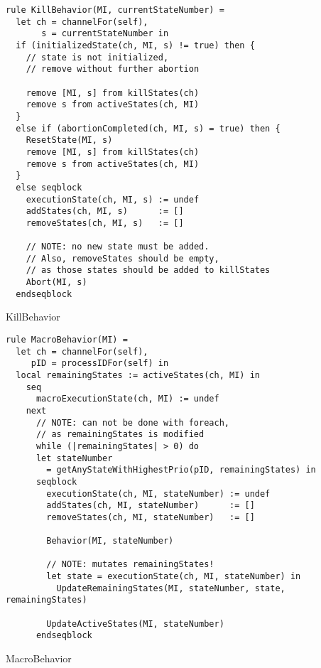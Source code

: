 \begin{listing}[H]
\begin{verbatim}
rule KillBehavior(MI, currentStateNumber) =
  let ch = channelFor(self),
       s = currentStateNumber in
  if (initializedState(ch, MI, s) != true) then {
    // state is not initialized,
    // remove without further abortion

    remove [MI, s] from killStates(ch)
    remove s from activeStates(ch, MI)
  }
  else if (abortionCompleted(ch, MI, s) = true) then {
    ResetState(MI, s)
    remove [MI, s] from killStates(ch)
    remove s from activeStates(ch, MI)
  }
  else seqblock
    executionState(ch, MI, s) := undef
    addStates(ch, MI, s)      := []
    removeStates(ch, MI, s)   := []

    // NOTE: no new state must be added.
    // Also, removeStates should be empty,
    // as those states should be added to killStates
    Abort(MI, s)
  endseqblock
\end{verbatim}
\caption{KillBehavior}
\label{lst:asm:KillBehavior}
\end{listing}




\begin{listing}[H]
\begin{verbatim}
rule MacroBehavior(MI) =
  let ch = channelFor(self),
     pID = processIDFor(self) in
  local remainingStates := activeStates(ch, MI) in
    seq
      macroExecutionState(ch, MI) := undef
    next
      // NOTE: can not be done with foreach,
      // as remainingStates is modified
      while (|remainingStates| > 0) do
      let stateNumber
        = getAnyStateWithHighestPrio(pID, remainingStates) in
      seqblock
        executionState(ch, MI, stateNumber) := undef
        addStates(ch, MI, stateNumber)      := []
        removeStates(ch, MI, stateNumber)   := []

        Behavior(MI, stateNumber)

        // NOTE: mutates remainingStates!
        let state = executionState(ch, MI, stateNumber) in
          UpdateRemainingStates(MI, stateNumber, state, remainingStates)

        UpdateActiveStates(MI, stateNumber)
      endseqblock
\end{verbatim}
\caption{MacroBehavior}
\label{lst:asm:MacroBehavior}
\end{listing}




